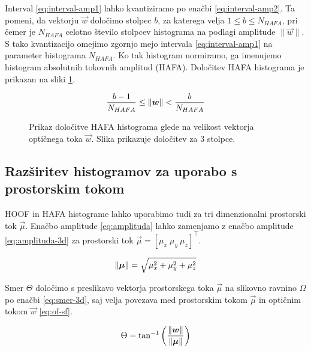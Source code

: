 Interval \eqref{eq:interval-amp1} lahko kvantiziramo po enačbi \eqref{eq:interval-amp2}. Ta pomeni, da vektorju $\vec{w}$ določimo stolpec $b$, za katerega velja $1 \leq b \leq N_{HAFA}$, pri čemer je $N_{HAFA}$ celotno število stolpcev histograma na podlagi amplitude $\| \vec{w} \|$. S tako kvantizacijo omejimo zgornjo mejo intervala \eqref{eq:interval-amp1} na parameter histograma $N_{HAFA}$. Ko tak histogram normiramo, ga imenujemo histogram absolutnih tokovnih amplitud (HAFA). Določitev HAFA histograma je prikazan na sliki \ref{fig:hafa-histogram}.

\begin{equation}\label{eq:interval-amp2}
	\frac{b-1}{N_{HAFA}} \leq \left\lVert {\boldsymbol{w}} \right\rVert < \frac{b}{N_{HAFA}}
\end{equation}




\begin{figure}[!htb]
\centering

\caption[Prikaz določitve HAFA histograma glede na velikost vektorja]{Prikaz določitve HAFA histograma glede na velikost vektorja optičnega toka $\vec{w}$. Slika prikazuje določitev za $3$ stolpce.}
\label{fig:hafa-histogram}
\end{figure}



\subsection{Razširitev histogramov za uporabo s prostorskim tokom}
HOOF in HAFA histograme lahko uporabimo tudi za tri dimenzionalni prostorski tok $\vec{\mu}$. Enačbo amplitude \eqref{eq:amplituda} lahko zamenjamo z enačbo amplitude \eqref{eq:amplituda-3d} za prostorski tok $\vec{\mu} = \left[\mu_x~\mu_y~\mu_z \right]^\top$.

\begin{equation}
\left\lVert {\boldsymbol{\mu}} \right\rVert = \sqrt{\mu_x^2 + \mu_y^2 + \mu_z^2} 
\label{eq:amplituda-3d}
\end{equation}

Smer $\Theta$ določimo s preslikavo vektorja prostorskega toka $\vec{\mu}$ na slikovno ravnino $\mathit{\Omega}$ po enačbi \eqref{eq:smer-3d}, saj velja povezava med prostorskim tokom $\vec{\mu}$ in optičnim tokom $\vec{w}$ \eqref{eq:of-sf}.


\begin{equation}
\Theta = \tan^{-1}\left( \frac{\left\lVert {\boldsymbol{w}} \right\rVert}{\left\lVert {\boldsymbol{\mu}} \right\rVert} \right)
\label{eq:smer-3d}
\end{equation}

